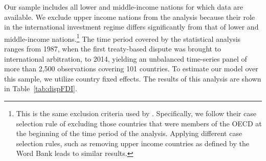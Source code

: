 \documentclass[12pt,onesided]{amsart}
\begin{document}
Our sample includes all lower and middle-income nations for which data are available. We exclude upper income nations from the analysis because their role in the international investment regime differs significantly from that of lower and middle-income nations.\footnote{This is the same exclusion criteria used by \citet{allee:peinhardt:2011}. Specifically, we follow their case selection rule of excluding those countries that were members of the OECD at the beginning of the time period of the analysis. Applying different case selection rules, such as removing upper income countries as defined by the Word Bank leads to similar results.} The time period covered by the statistical analysis ranges from 1987, when the first treaty-based dispute was brought to international arbitration, to 2014, yielding an unbalanced time-series panel of more than 2,500 observations covering 101 countries. To estimate our model over this sample, we utilize country fixed effects. The results of this analysis are shown in Table~\ref{tab:dispFDI}.
\end{document}
